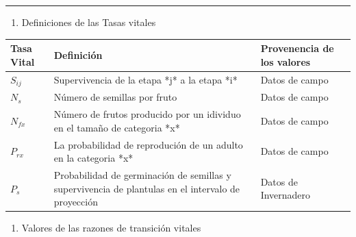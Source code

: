 \documentclass[
]{book}
\providecommand{\tightlist}{%
  \setlength{\itemsep}{0pt}\setlength{\parskip}{0pt}}
\theoremstyle{definition}
\theoremstyle{definition}
\theoremstyle{definition}
\theoremstyle{definition}
\theoremstyle{remark}
\begin{document}
\begin{center}\rule{0.5\linewidth}{0.5pt}\end{center}

\begin{enumerate}
\def\labelenumi{(\Alph{enumi})}
\setcounter{enumi}{4}
\tightlist
\item
  Definiciones de las Tasas vitales
\end{enumerate}

\begin{tabular}{l|l|l}
\hline
Tasa Vital & Definición & Provenencia de los valores\\
\hline
$S_{ij}$ & Supervivencia de la etapa *j* a la etapa *i* & Datos de campo\\
\hline
$N_{s}$ & Número de semillas por fruto & Datos de campo\\
\hline
$N_{fx}$ & Número de frutos producido por un idividuo en el tamaño de categoria *x* & Datos de campo\\
\hline
$P_{rx}$ & La probabilidad de reprodución de un adulto en la categoria *x* & Datos de campo\\
\hline
$P_{s}$ & Probabilidad de germinación de semillas y supervivencia de plantulas en el intervalo de proyección & Datos de Invernadero\\
\hline
\end{tabular}

\begin{enumerate}
\def\labelenumi{(\Alph{enumi})}
\setcounter{enumi}{5}
\tightlist
\item
  Valores de las razones de transición vitales
\end{enumerate}
\end{document}
